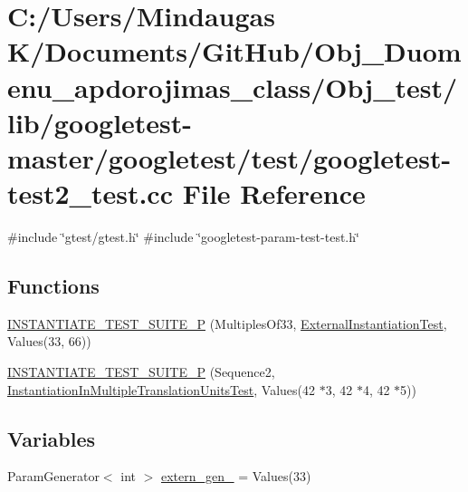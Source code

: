 \hypertarget{_obj__test_2lib_2googletest-master_2googletest_2test_2googletest-test2__test_8cc}{}\section{C\+:/\+Users/\+Mindaugas K/\+Documents/\+Git\+Hub/\+Obj\+\_\+\+Duomenu\+\_\+apdorojimas\+\_\+class/\+Obj\+\_\+test/lib/googletest-\/master/googletest/test/googletest-\/test2\+\_\+test.cc File Reference}
\label{_obj__test_2lib_2googletest-master_2googletest_2test_2googletest-test2__test_8cc}
{\ttfamily \#include \char`\"{}gtest/gtest.\+h\char`\"{}}\newline
{\ttfamily \#include \char`\"{}googletest-\/param-\/test-\/test.\+h\char`\"{}}\newline
\subsection*{Functions}
\begin{DoxyCompactItemize}
\item 
\mbox{\hyperlink{_obj__test_2lib_2googletest-master_2googletest_2test_2googletest-test2__test_8cc_a9092fbc5f642e0be66474b214fae76c9}{I\+N\+S\+T\+A\+N\+T\+I\+A\+T\+E\+\_\+\+T\+E\+S\+T\+\_\+\+S\+U\+I\+T\+E\+\_\+P}} (Multiples\+Of33, \mbox{\hyperlink{class_external_instantiation_test}{External\+Instantiation\+Test}}, Values(33, 66))
\item 
\mbox{\hyperlink{_obj__test_2lib_2googletest-master_2googletest_2test_2googletest-test2__test_8cc_a636f24ec7688ea5d70c09b8b73639e55}{I\+N\+S\+T\+A\+N\+T\+I\+A\+T\+E\+\_\+\+T\+E\+S\+T\+\_\+\+S\+U\+I\+T\+E\+\_\+P}} (Sequence2, \mbox{\hyperlink{class_instantiation_in_multiple_translation_units_test}{Instantiation\+In\+Multiple\+Translation\+Units\+Test}}, Values(42 $\ast$3, 42 $\ast$4, 42 $\ast$5))
\end{DoxyCompactItemize}
\subsection*{Variables}
\begin{DoxyCompactItemize}
\item 
Param\+Generator$<$ int $>$ \mbox{\hyperlink{_obj__test_2lib_2googletest-master_2googletest_2test_2googletest-test2__test_8cc_a4c9bff52d70a57c0563599a919c33bc9}{extern\+\_\+gen\+\_}} = Values(33)
\end{DoxyCompactItemize}


